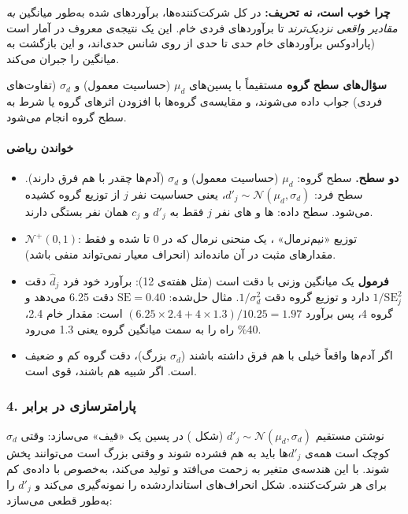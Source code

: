 \textbf{چرا  خوب است، نه تحریف:} در کل شرکت‌کننده‌ها،
برآوردهای شده به‌طور میانگین \emph{به مقادیر واقعی نزدیک‌ترند}
تا برآوردهای فردی خام. این یک نتیجه‌ی معروف در آمار است (پارادوکس
 برآوردهای خام حدی تا حدی از روی شانس حدی‌اند، و
 این بازگشت به میانگین را جبران می‌کند.

\textbf{سؤال‌های سطح گروه} مستقیماً با پسین‌های \(\mu_d\) (حساسیت معمول) و
\(\sigma_d\) (تفاوت‌های فردی) جواب داده می‌شوند، و مقایسه‌ی گروه‌ها با
افزودن اثرهای گروه یا شرط به سطح گروه انجام می‌شود.

\paragraph{خواندن ریاضی}

\begin{itemize}
\tightlist
\item
  \textbf{دو سطح.} سطح گروه: \(\mu_d\) (حساسیت معمول) و \(\sigma_d\)
  (آدم‌ها چقدر با هم فرق دارند). سطح فرد:
  \(d'_j \sim \mathcal{N}(\mu_d,\allowbreak \sigma_d)\)، یعنی حساسیت نفر \(j\) از
  توزیع گروه کشیده می‌شود. سطح داده: ها و های نفر
  \(j\) فقط به \(d'_j\) و \(c_j\) همان نفر بستگی دارند.
\item
  \(\mathcal{N}^{+}(0, 1)\): توزیع «نیم‌نرمال» ، یک
  منحنی نرمال که در 0 تا شده و فقط مقدارهای مثبت در آن مانده‌اند (انحراف
  معیار نمی‌تواند منفی باشد).
\item
  \textbf{فرمول } یک میانگین وزنی با دقت است (مثل هفته‌ی
  12): برآورد خود فرد \(\hat d_j\) دقت \(1/\mathrm{SE}_j^2\) دارد و
  توزیع گروه دقت \(1/\sigma_d^2\). مثال حل‌شده: \(\mathrm{SE} = 0.40\)
  دقت 6.25 می‌دهد و گروه 4، پس برآورد
  \((6.25 \times 2.4 + 4 \times 1.3)/10.25 = 1.97\) است: مقدار خام 2.4،
  40\% راه را به سمت میانگین گروه یعنی 1.3 می‌رود.
\item
  اگر آدم‌ها واقعاً خیلی با هم فرق داشته باشند (\(\sigma_d\) بزرگ)، دقت
  گروه کم و  ضعیف است. اگر شبیه هم باشند، 
  قوی است.
\end{itemize}

\subsubsection{\texorpdfstring{4. پارامترسازی  در برابر
}{4. پارامترسازی centered در برابر non-centered}}

نوشتن مستقیم \(d'_j \sim \mathcal{N}(\mu_d,\allowbreak \sigma_d)\) (شکل
\textbf{}) در پسین یک «قیف» می‌سازد: وقتی \(\sigma_d\) کوچک
است همه‌ی \(d'_j\)ها باید به هم فشرده شوند و وقتی بزرگ است می‌توانند پخش
شوند.  با این هندسه‌ی متغیر به زحمت می‌افتد و 
تولید می‌کند، به‌خصوص با داده‌ی کم برای هر شرکت‌کننده. شکل
\textbf{} انحراف‌های استانداردشده را نمونه‌گیری می‌کند و
\(d'_j\) را به‌طور قطعی می‌سازد:


